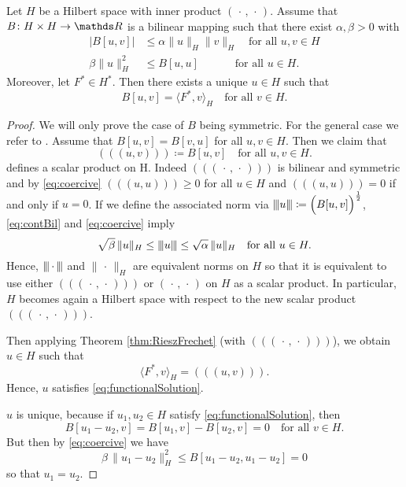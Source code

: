 \begin{thm}
  \label{thm:Lax-Milgram}
  Let $H$ be a Hilbert space with inner product $(\,\cdot\, , \,\cdot\,)$.
  Assume that $B \colon H \times H \to \R$ is a bilinear mapping such that there exist $\alpha, \beta > 0$ with 
  \begin{align}
    \label{eq:contBil}
    |B[u,v]| &\leq \alpha \|u\|_H \|v\|_H \quad\text{for all } u, v \in H \\
    \label{eq:coercive}
    \beta \|u\|_H^2 &\leq B[u,u] \;\quad\quad\quad\text{for all } u \in H.
  \end{align}
  Moreover, let $F^* \in H^*$.
  Then there exists a unique $u \in H$ such that
  \begin{equation}
    \label{eq:functionalSolution}
    B[u,v] = \langle F^*, v \rangle_H \quad \text{for all } v \in H.
  \end{equation}
\end{thm}

\begin{proof}
  We will only prove the case of $B$ being symmetric.
  For the general case we refer to \cite[Theorem 1 in Section 6.2.1]{evans2010partial}.
  Assume that $B[u,v] = B[v,u]$ for all $u,v \in H$.
  Then we claim that
  $$
  (\!(\!( u, v )\!)\!) \coloneqq B[u,v] \quad\text{for all } u,v \in H.
  $$
  defines a scalar product on H.
  Indeed $(\!(\!(\,\cdot\, , \,\cdot\, )\!)\!)$ is bilinear and symmetric and by \eqref{eq:coercive} $(\!(\!(u,u )\!)\!) \geq 0$ for all $u \in H$ and $(\!(\!( u,u )\!)\!) = 0$ if and only if $u = 0$.
  If we define the associated norm via ${\left\vert\kern-0.25ex\left\vert\kern-0.25ex\left\vert u \right\vert\kern-0.25ex\right\vert\kern-0.25ex\right\vert} \coloneqq \Big( B[u,v] \Big)^{\frac{1}{2}}$, \eqref{eq:contBil} and \eqref{eq:coercive} imply
  $$
  \sqrt{\beta} \, \|u\|_H \leq {\left\vert\kern-0.25ex\left\vert\kern-0.25ex\left\vert u \right\vert\kern-0.25ex\right\vert\kern-0.25ex\right\vert} \leq \sqrt{\alpha} \, \|u\|_H \quad\text{for all } u \in H.
  $$
  Hence, ${\left\vert\kern-0.25ex\left\vert\kern-0.25ex\left\vert  \,\cdot\, \right\vert\kern-0.25ex\right\vert\kern-0.25ex\right\vert}$ and $\|\,\cdot\,\|_H$ are equivalent norms on $H$ so that it is equivalent to use either $(\!(\!( \,\cdot\, , \,\cdot\, )\!)\!)$ or $(\,\cdot\, , \,\cdot\,)$ on $H$ as a scalar product. In particular, $H$ becomes again a Hilbert space with respect to the new scalar product $(\!(\!( \,\cdot\, , \,\cdot\, )\!)\!)$.

  Then applying Theorem \ref{thm:RieszFrechet} (with $(\!(\!( \,\cdot\, , \,\cdot\, )\!)\!)$), we obtain $u \in H$ such that
  $$
  \langle F^* , v \rangle_H = (\!(\!( u , v )\!)\!).
  $$
  Hence, $u$ satisfies \eqref{eq:functionalSolution}.

  $u$ is unique, because if $u_1, u_2 \in H$ satisfy \eqref{eq:functionalSolution}, then
  $$
  B[u_1 - u_2, v] = B[u_1, v] - B[u_2, v] = 0 \quad\text{for all } v \in H.
  $$
  But then by \eqref{eq:coercive} we have
  $$
  \beta \, \|u_1 - u_2\|_H^2 \leq B[u_1 - u_2, u_1 - u_2] = 0
  $$
  so that $u_1 = u_2$.
\end{proof}

